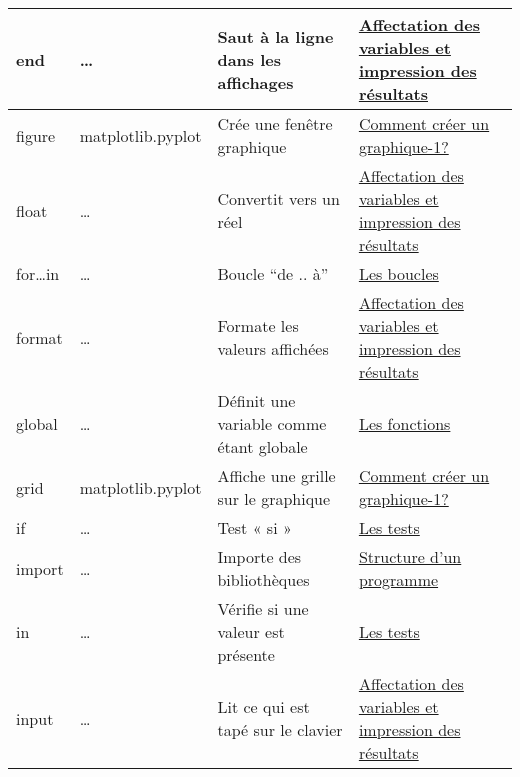 \begin{longtable}{@{\extracolsep{\fill}}|p{} | p{} |p{} | p{}|@{}}
end
 & 
\ldots{}
 & 
Saut à la ligne dans les affichages
 & 
\href{https://pyspc.readthedocs.io/fr/latest/05-bases/02-variables_input_print.html}{Affectation
des variables et impression des résultats}
\\ \hline

figure
 & 
matplotlib.pyplot
 & 
Crée une fenêtre graphique
 & 
\href{https://pyspc.readthedocs.io/fr/latest/05-bases/10-graphiques_partie_1.html}{Comment
créer un graphique-1?}
\\ \hline

float
 & 
\ldots{}
 & 
Convertit vers un réel
 & 
\href{https://pyspc.readthedocs.io/fr/latest/05-bases/02-variables_input_print.html}{Affectation
des variables et impression des résultats}
\\ \hline

for\ldots{}in
 & 
\ldots{}
 & 
Boucle ``de .. à''
 & 
\href{https://pyspc.readthedocs.io/fr/latest/05-bases/06-boucles.html}{Les
boucles}
\\ \hline

format
 & 
\ldots{}
 & 
Formate les valeurs affichées
 & 
\href{https://pyspc.readthedocs.io/fr/latest/05-bases/02-variables_input_print.html}{Affectation
des variables et impression des résultats}
\\ \hline

global
 & 
\ldots{}
 & 
Définit une variable comme étant globale
 & 
\href{https://pyspc.readthedocs.io/fr/latest/05-bases/05-bases/03-fonctions.html}{Les
fonctions}
\\ \hline

grid
 & 
matplotlib.pyplot
 & 
Affiche une grille sur le graphique
 & 
\href{https://pyspc.readthedocs.io/fr/latest/05-bases/10-graphiques_partie_1.html}{Comment
créer un graphique-1?}
\\ \hline

if
 & 
\ldots{}
 & 
Test « si »
 & 
\href{https://pyspc.readthedocs.io/fr/latest/05-bases/05-tests.html}{Les
tests}
\\ \hline

import
 & 
\ldots{}
 & 
Importe des bibliothèques
 & 
\href{https://pyspc.readthedocs.io/fr/latest/05-bases/01-structure-programme.html}{Structure
d'un programme}
\\ \hline

in
 & 
\ldots{}
 & 
Vérifie si une valeur est présente
 & 
\href{https://pyspc.readthedocs.io/fr/latest/05-bases/05-tests.html}{Les
tests}
\\ \hline

input
 & 
\ldots{}
 & 
Lit ce qui est tapé sur le clavier
 & 
\href{https://pyspc.readthedocs.io/fr/latest/05-bases/02-variables_input_print.html}{Affectation
des variables et impression des résultats}
\\ \hline


\end{longtable}
